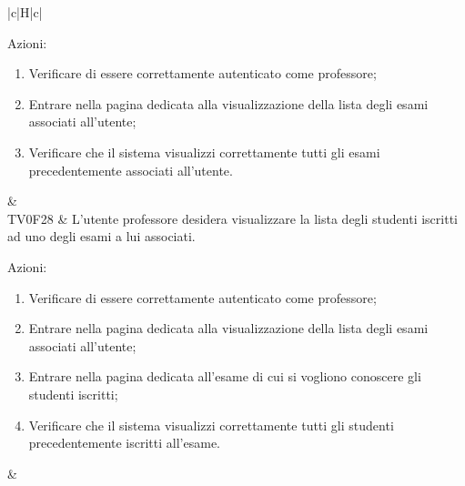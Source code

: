 \begin{longtable}{|c|H|c|}
\begin{flushleft}
			Azioni:\newline
		\end{flushleft}
		\begin{enumerate}
			\item Verificare di essere correttamente autenticato come professore;
			\item Entrare nella pagina dedicata alla visualizzazione della lista degli esami associati all'utente;
			\item Verificare che il sistema visualizzi correttamente tutti gli esami precedentemente associati all'utente.
		\end{enumerate} & \Tni \\
		\hline
		TV0F28 & L'utente professore desidera visualizzare la lista degli studenti iscritti ad uno degli esami a lui associati. \newline \begin{flushleft}
			Azioni:\newline
		\end{flushleft}
		\begin{enumerate}
			\item Verificare di essere correttamente autenticato come professore;
			\item Entrare nella pagina dedicata alla visualizzazione della lista degli esami associati all'utente;
			\item Entrare nella pagina dedicata all'esame di cui si vogliono conoscere gli studenti iscritti;
			\item Verificare che il sistema visualizzi correttamente tutti gli studenti precedentemente iscritti all'esame.
		\end{enumerate} & \Tni \\
	\hline
	\caption[Test di validazione]{Test di validazione}
	\label{tabella:TV}
\end{longtable}

